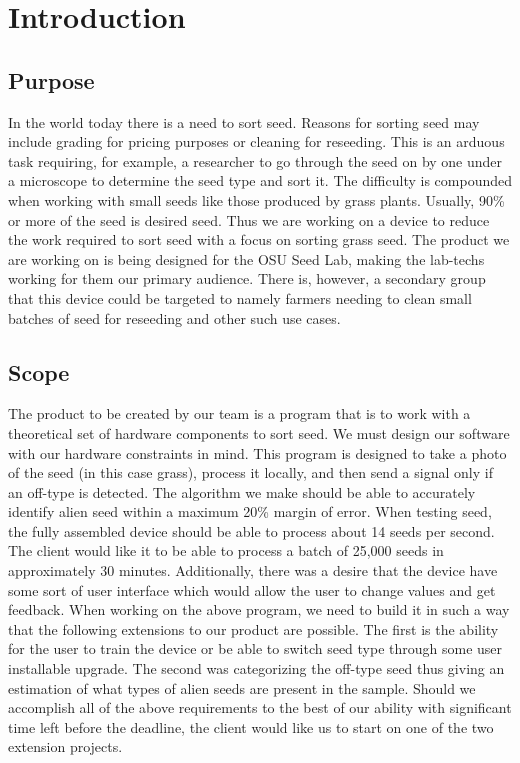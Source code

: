 \documentclass[onecolumn, draftclsnofoot,10pt, compsoc]{IEEEtran}
\begin{document}
	
	\section{Introduction}
	
	\subsection{Purpose}
	In the world today there is a need to sort seed.
	Reasons for sorting seed may include grading for pricing purposes or cleaning for reseeding.
	This is an arduous task requiring, for example, a researcher to go through the seed on by one under a microscope to determine the seed type and sort it.
	The difficulty is compounded when working with small seeds like those produced by grass plants.
	Usually, 90\% or more of the seed is desired seed.
	Thus we are working on a device to reduce the work required to sort seed with a focus on sorting grass seed.
	The product we are working on is being designed for the OSU Seed Lab, making the lab-techs working for them our primary audience.
	There is, however, a secondary group that this device could be targeted to namely farmers needing to clean small batches of seed for reseeding and other such use cases.
	
	\subsection{Scope}
	The product to be created by our team is a program that is to work with a theoretical set of hardware components to sort seed. We must design our software with our hardware constraints in mind. 
	This program is designed to take a photo of the seed (in this case grass), process it locally, and then send a signal only if an off-type is detected.
	The algorithm we make should be able to accurately identify alien seed within a maximum 20\% margin of error.
	When testing seed, the fully assembled device should be able to process about 14 seeds per second.
	The client would like it to be able to process a batch of 25,000 seeds in approximately 30 minutes.
	Additionally, there was a desire that the device have some sort of user interface which would allow the user to change values and get feedback.
	When working on the above program, we need to build it in such a way that the following extensions to our product are possible.
	The first is the ability for the user to train the device or be able to switch seed type through some user installable upgrade.
	The second was categorizing the off-type seed thus giving an estimation of what types of alien seeds are present in the sample.
	Should we accomplish all of the above requirements to the best of our ability with significant time left before the deadline, the client would like us to start on one of the two extension projects.
	
\end{document}
